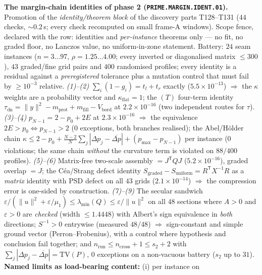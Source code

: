 \par\smallskip\noindent\textbf{The margin-chain identities of phase 2
(\texttt{PRIME.MARGIN.IDENT.01}).}
Promotion of the \emph{identity/theorem block} of the discovery parts
T128--T131 ($44$ checks, ${\sim}0.2$\,s; every check recomputed on small
frame-A windows). Scope fence, declared with the row: identities and
\emph{per-instance} theorems only --- no fit, no graded floor, no Lanczos
value, no uniform-in-zone statement. Battery: $24$ seam instances
($n=3\ldots97$, $\rho=1.25\ldots4.00$; every inverted or diagonalised matrix
$\le300$), $43$ graded/fine grid pairs and $400$ randomised profiles; every
identity is a residual against a \emph{preregistered} tolerance plus a mutation
control that must fail by $\ge10^{-3}$ relative.
\emph{(1)--(2)} $\sum_i(1-g_i)=t_l+t_r$ exactly ($5.5\times10^{-13}$)
$\Rightarrow$ the $\kappa$ weights are a probability vector and
$\kappa_{\mathrm{flat}}=1$; the $(T)$ four-term identity
$\tau_{\mathrm{dn}}=\|y\|^2-m_{\mathrm{prot}}+m_{\mathrm{fill}}-V_{\mathrm{bord}}$
at $2.2\times10^{-16}$ (two independent routes for $\tau$).
\emph{(3)--(4)} $p_{N-1}=2-p_0+2E$ at $2.3\times10^{-16}$ $\Rightarrow$ the
equivalence $2E>p_0\iff p_{N-1}>2$ ($0$ exceptions, both branches realised);
the Abel/H\"older chain
$\kappa\le2-p_0+\frac{N-2}{N}\sum_j|\Delta p_j-\overline{\Delta p}|+(p_{\max}-p_{N-1})$
per instance ($0$ violations; the same chain \emph{without} the curvature term
is violated on $88/400$ profiles).
\emph{(5)--(6)} Matrix-free two-scale assembly $=J^{\mathsf T}QJ$
($5.2\times10^{-16}$), graded overlap $=J$; the C\'ea/Strang defect identity
$S_{\mathrm{graded}}-S_{\mathrm{uniform}}=R^{\mathsf T}X^{-1}R$ as a
\emph{matrix} identity with PSD defect on all $43$ grids
($2.1\times10^{-14}$) $\Rightarrow$ the compression error is one-sided by
construction.
\emph{(7)--(9)} The secular sandwich
$\varepsilon/(\|u\|^2+\varepsilon/\mu_1)\le\lambda_{\min}(Q)\le\varepsilon/\|u\|^2$
on all $48$ sections where $A>0$ and $\varepsilon>0$ are \emph{checked} (width
$\le1.4448$) with Albert's sign equivalence in \emph{both} directions;
$S^{-1}>0$ entrywise (measured $48/48$) $\Rightarrow$ sign-constant and simple
ground vector (Perron--Frobenius), with a control where hypothesis and
conclusion fail together; and
$n_{\mathrm{run}}\le n_{\mathrm{cross}}+1\le s_2+2$ with
$\sum_j|\Delta p_j-\overline{\Delta p}|=\mathrm{TV}(P)$, $0$ exceptions on a
non-vacuous battery ($s_2$ up to $31$).
\textbf{Named limits as load-bearing content:} (i) per instance on
